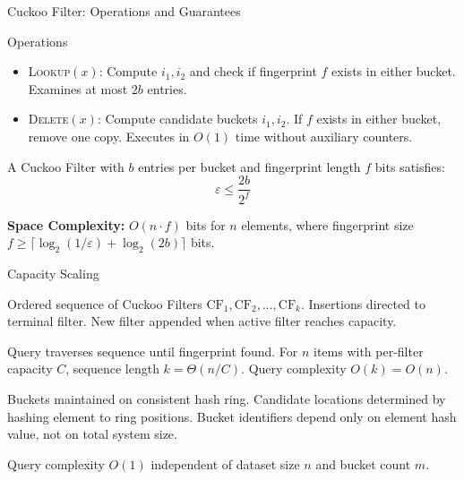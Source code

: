 \documentclass{beamer}
\begin{document}
\begin{frame}{Cuckoo Filter: Operations and Guarantees}

    \begin{block}{Operations}
        \begin{itemize}
            \item \textsc{Lookup}$(x)$: Compute $i_1, i_2$ and check if fingerprint $f$ exists in either bucket. Examines at most $2b$ entries.
            \item \textsc{Delete}$(x)$: Compute candidate buckets $i_1, i_2$. If $f$ exists in either bucket, remove one copy. Executes in $O(1)$ time without auxiliary counters.
        \end{itemize}
    \end{block}

    \begin{theorem}
        A Cuckoo Filter with $b$ entries per bucket and fingerprint length $f$ bits satisfies:
        $$\varepsilon \leq \frac{2b}{2^f}$$
    \end{theorem}

    \textbf{Space Complexity:} $O(n \cdot f)$ bits for $n$ elements, where fingerprint size $f \geq \lceil \log_2(1/\varepsilon) + \log_2(2b) \rceil$ bits.

\end{frame}

\begin{frame}{Capacity Scaling}

    \begin{definition}
        Ordered sequence of Cuckoo Filters $\text{CF}_1, \text{CF}_2, \ldots, \text{CF}_k$. Insertions directed to terminal filter. New filter appended when active filter reaches capacity.
    \end{definition}

    Query traverses sequence until fingerprint found. For $n$ items with per-filter capacity $C$, sequence length $k = \Theta(n/C)$. Query complexity $O(k) = O(n)$.

    \begin{definition}
        Buckets maintained on consistent hash ring. Candidate locations determined by hashing element to ring positions. Bucket identifiers depend only on element hash value, not on total system size.
    \end{definition}

    Query complexity $O(1)$ independent of dataset size $n$ and bucket count $m$.

\end{frame}
\end{document}
